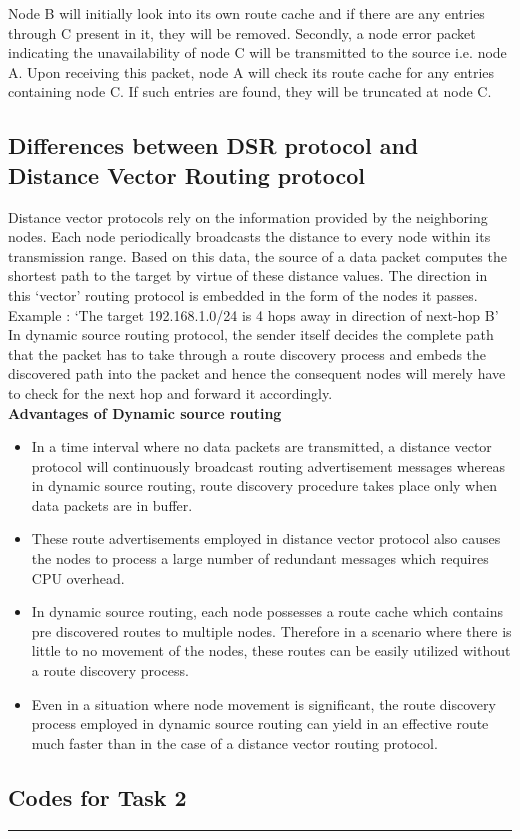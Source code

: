 \documentclass[a4paper,11pt]{article}%
\begin{document}
Node B will initially look into its own route cache and if there are any entries through C present in it, they will be removed. Secondly, a node error packet indicating the unavailability of node C will be transmitted to the source i.e. node A. Upon receiving this packet, node A will check its route cache for any entries containing node C. If such entries are found, they will be truncated at node C.


\subsection{Differences between DSR protocol  and Distance Vector Routing protocol}

Distance vector protocols rely on the information provided by the neighboring nodes. Each node periodically broadcasts the distance to every node within its transmission range. Based on this data, the source of a data packet computes the shortest path to the target by virtue of these distance values. The direction in this ‘vector’ routing protocol is embedded in the form of the nodes it passes\cite{dsr1}\cite{dsr2}.\\

Example : ‘The target 192.168.1.0/24 is 4 hops away in direction of next-hop B’\\

In dynamic source routing protocol, the sender itself decides the complete path that the packet has to take through a route discovery process and embeds the discovered path into the packet and hence the consequent nodes will merely have to check for the next hop and forward it accordingly.\\

\textbf{Advantages of Dynamic source routing}

\begin{itemize}
	\item In a time interval where no data packets are transmitted, a distance vector protocol will continuously broadcast routing advertisement messages whereas in dynamic source routing, route discovery procedure takes place only when data packets are in buffer.
\item These route advertisements employed in distance vector protocol also causes the nodes to process a large number of redundant messages which requires CPU overhead.
\item In dynamic source routing, each node possesses a route cache which contains pre discovered routes to multiple nodes. Therefore in a scenario where there is little to no movement of the nodes, these routes can be easily utilized without a route discovery process.
\item Even in a situation where node movement is significant, the route discovery process employed in dynamic source routing can yield in an effective route much faster than in the case of a distance vector routing protocol.

\end{itemize}

\subsection{Codes for Task 2}

\vfill
\hrule
\vspace{1cm}



\end{document}
